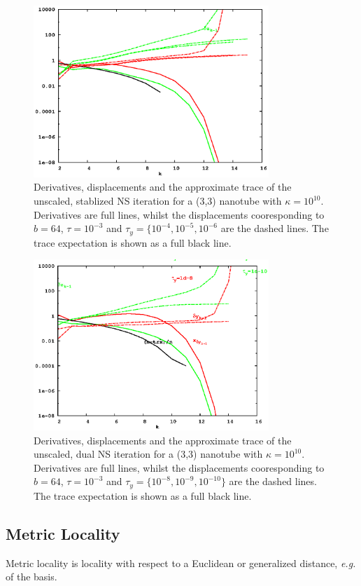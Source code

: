 \documentclass[letterpaper,twocolumn,amsmath,amsfont,amssymb,english,aps,jcp,preprintnumbers,groupaddress,nofootinbib,tightenlines]{revtex4}
\begin{document}
\begin{figure}[h]
\includegraphics[width=3.5in]{fig_wtrbx_100_noscaling/wtrbx_100_noscale_stab.eps}
\caption{Derivatives, displacements and the approximate trace of the unscaled, stablized NS iteration for a (3,3)
nanotube with $\kappa =10^{10}$.
Derivatives are full lines, whilst the displacements cooresponding to $b=64$, $\tau=10^{-3}$ and
$\tau_y=\{10^{-4}, 10^{-5}, 10^{-6}$  are the dashed lines.  The trace expectation is shown as a full black line. }
\end{figure}


\begin{figure}[h]
\includegraphics[width=3.5in]{fig_wtrbx_100_noscaling/wtrbx_100_noscale_dual.eps}
\caption{Derivatives, displacements and the approximate trace of the unscaled, dual NS iteration for a (3,3) nanotube with $\kappa =10^{10}$.
Derivatives are full lines, whilst the displacements cooresponding to $b=64$, $\tau=10^{-3}$ and $\tau_y=\{10^{-8}, 10^{-9}, 10^{-10}\}$
are the dashed lines.  The trace expectation is shown as a full black line. }
\end{figure}

\subsection{Metric Locality}
Metric locality is locality with respect to a Euclidean or generalized distance, {\em e.g.} of the basis.
\end{document}
